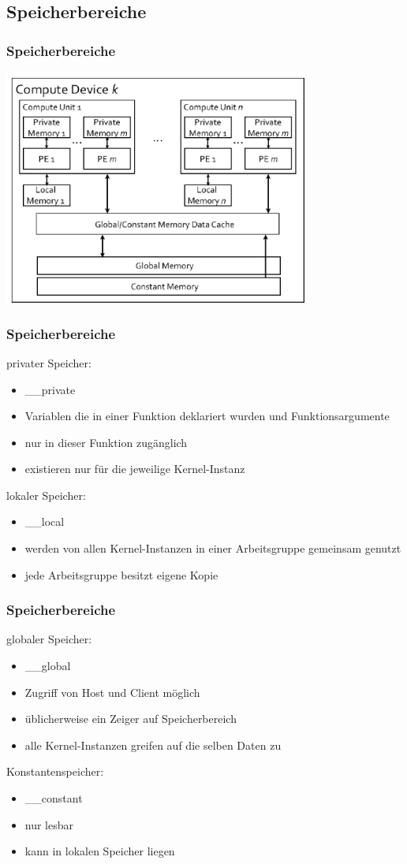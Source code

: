\documentclass{beamer}
\begin{document}
\subsection{Speicherbereiche}
\begin{frame}[fragile]
\frametitle{Speicherbereiche}
\begin{center}
\includegraphics[width=10cm]{opencl_memory.jpg}
\end{center}
\end{frame}

\begin{frame}[fragile]
\frametitle{Speicherbereiche}
privater Speicher:
\begin{itemize}
\item \_\_private
\item Variablen die in einer Funktion deklariert wurden und Funktionsargumente
\item nur in dieser Funktion zugänglich
\item existieren nur für die jeweilige Kernel-Instanz
\end{itemize}
lokaler Speicher:
\begin{itemize}
\item \_\_local
\item werden von allen Kernel-Instanzen in einer Arbeitsgruppe gemeinsam genutzt
\item jede Arbeitsgruppe besitzt eigene Kopie 
\end{itemize}
\end{frame}

\begin{frame}[fragile]
\frametitle{Speicherbereiche}
globaler Speicher:
\begin{itemize}
\item \_\_global
\item Zugriff von Host und Client möglich
\item üblicherweise ein Zeiger auf Speicherbereich
\item alle Kernel-Instanzen greifen auf die selben Daten zu
\end{itemize}
Konstantenspeicher:
\begin{itemize}
\item \_\_constant
\item nur lesbar
\item kann in lokalen Speicher liegen
\end{itemize}
\end{frame}
\end{document}
